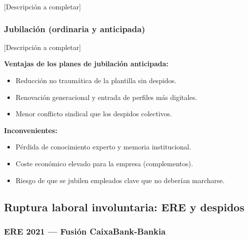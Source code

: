 [Descripción a completar]

\subsubsection{Jubilación (ordinaria y anticipada)}


[Descripción a completar]

\textbf{Ventajas de los planes de jubilación anticipada:}
\begin{itemize}
  \item Reducción no traumática de la plantilla sin despidos.
  \item Renovación generacional y entrada de perfiles más digitales.
  \item Menor conflicto sindical que los despidos colectivos.
\end{itemize}

\textbf{Inconvenientes:}
\begin{itemize}
  \item Pérdida de conocimiento experto y memoria institucional.
  \item Coste económico elevado para la empresa (complementos).
  \item Riesgo de que se jubilen empleados clave que no deberían marcharse.
\end{itemize}

\subsection{Ruptura laboral involuntaria: ERE y despidos}

\subsubsection{ERE 2021 — Fusión CaixaBank-Bankia}



